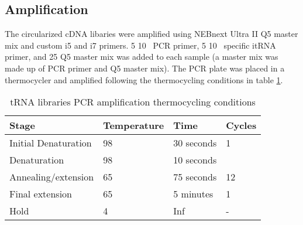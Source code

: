 \subsection{Amplification}
The circularized cDNA libaries were amplified using NEBnext Ultra II Q5 master mix and custom i5 and i7 primers.
5\ul{} 10\si{\micro\Molar} PCR primer, 5\ul{} 10\si{\micro\Molar} specific itRNA primer, and 25\ul{} Q5 master mix was added to each sample (a master mix was made up of PCR primer and Q5 master mix).
The PCR plate was placed in a thermocycler and amplified following the thermocycling conditions in table \ref{tab:my-pcr_tRNA}.

\begin{table}[]
\centering
\begin{tabular}{|l|l|l|l|}
\hline
\rowcolor[HTML]{9B9B9B}
\textbf{Stage}       & \textbf{Temperature} & \textbf{Time} & \textbf{Cycles}      \\ \hline
Initial Denaturation & 98\C{}                  & 30 seconds    & 1                    \\ \hline
Denaturation         & 98\C{}                    & 10 seconds    &                      \\ \cline{1-3}
Annealing/extension  & 65\C{}                    & 75 seconds    & \multirow{-2}{*}{12} \\ \hline
Final extension      & 65\C{}                    & 5 minutes     & 1                    \\ \hline
Hold                 & 4\C{}                     & Inf           & -                    \\ \hline
\end{tabular}
\caption[tRNA libraries PCR amplification thermocycling conditions]{tRNA libraries PCR amplification thermocycling conditions}
\label{tab:my-pcr_tRNA}
\end{table}

